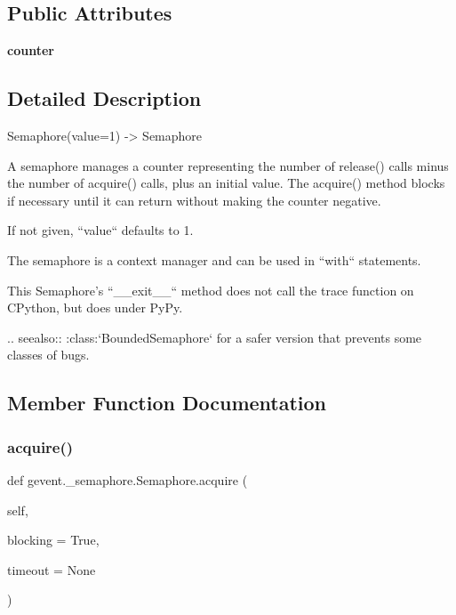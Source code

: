 \subsection*{Public Attributes}
\begin{DoxyCompactItemize}
\item 
\mbox{\label{classgevent_1_1__semaphore_1_1_semaphore_ac0c3add63c1d661e0713c409e4ff97f0}} 
{\bfseries counter}
\end{DoxyCompactItemize}


\subsection{Detailed Description}
\begin{DoxyVerb}Semaphore(value=1) -> Semaphore

A semaphore manages a counter representing the number of release()
calls minus the number of acquire() calls, plus an initial value.
The acquire() method blocks if necessary until it can return
without making the counter negative.

If not given, ``value`` defaults to 1.

The semaphore is a context manager and can be used in ``with`` statements.

This Semaphore's ``__exit__`` method does not call the trace function
on CPython, but does under PyPy.

.. seealso:: :class:`BoundedSemaphore` for a safer version that prevents
   some classes of bugs.
\end{DoxyVerb}
 

\subsection{Member Function Documentation}
\mbox{\label{classgevent_1_1__semaphore_1_1_semaphore_a656f8277b06803a835ea1c59acc8d069}} 
\subsubsection{\texorpdfstring{acquire()}{acquire()}}
{\footnotesize\ttfamily def gevent.\+\_\+semaphore.\+Semaphore.\+acquire (\begin{DoxyParamCaption}\item[{}]{self,  }\item[{}]{blocking = {\ttfamily True},  }\item[{}]{timeout = {\ttfamily None} }\end{DoxyParamCaption})}

